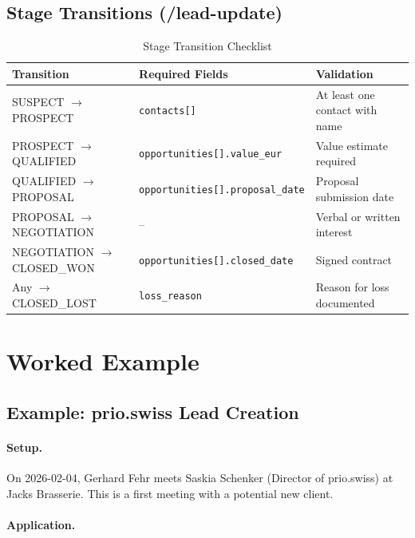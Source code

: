 \subsection{Stage Transitions (/lead-update)}

\begin{table}[htbp]
\centering
\caption{Stage Transition Checklist}
\label{tab:bn-stage-transition}
\renewcommand{\arraystretch}{1.3}
\begin{tabular}{@{}llp{6cm}@{}}
\toprule
\textbf{Transition} & \textbf{Required Fields} & \textbf{Validation} \\
\midrule
SUSPECT $\to$ PROSPECT & \texttt{contacts[]} & At least one contact with name \\
PROSPECT $\to$ QUALIFIED & \texttt{opportunities[].value\_eur} & Value estimate required \\
QUALIFIED $\to$ PROPOSAL & \texttt{opportunities[].proposal\_date} & Proposal submission date \\
PROPOSAL $\to$ NEGOTIATION & -- & Verbal or written interest \\
NEGOTIATION $\to$ CLOSED\_WON & \texttt{opportunities[].closed\_date} & Signed contract \\
Any $\to$ CLOSED\_LOST & \texttt{loss\_reason} & Reason for loss documented \\
\bottomrule
\end{tabular}
\end{table}


\section{Worked Example}
\label{sec:bn-example}

\subsection{Example: prio.swiss Lead Creation}

\paragraph{Setup.} On 2026-02-04, Gerhard Fehr meets Saskia Schenker (Director of prio.swiss) at Jacks Brasserie. This is a first meeting with a potential new client.

\paragraph{Application.}

